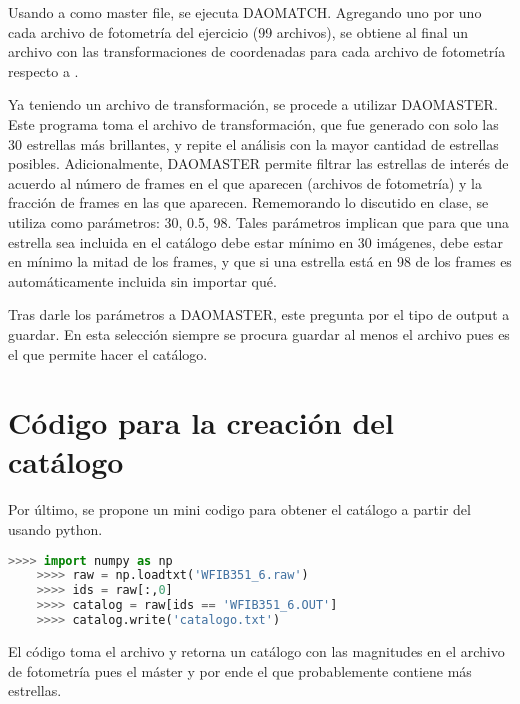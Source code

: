 \documentclass[12pt]{article}
\begin{document}
Usando a  como master file, se ejecuta DAOMATCH. Agregando uno por uno cada archivo de fotometría del ejercicio (99 archivos), se obtiene al final un archivo  con las transformaciones de coordenadas para cada archivo de fotometría respecto a .

Ya teniendo un archivo de transformación, se procede a utilizar DAOMASTER. Este programa toma el archivo de transformación, que fue generado con solo las 30 estrellas más brillantes, y repite el análisis con la mayor cantidad de estrellas posibles. Adicionalmente, DAOMASTER permite filtrar las estrellas de interés de acuerdo al número de frames en el que aparecen (archivos de fotometría) y la fracción de frames en las que aparecen. Rememorando lo discutido en clase, se utiliza como parámetros: 30, 0.5, 98.
Tales parámetros implican que para que una estrella sea incluida en el catálogo debe estar mínimo en 30 imágenes, debe estar en mínimo la mitad de los frames,  y que si una estrella está en 98 de los frames es automáticamente incluida sin importar qué.

Tras darle los parámetros a DAOMASTER, este pregunta por el tipo de output a guardar. En esta selección siempre se procura guardar al menos el archivo  pues es el que permite hacer el catálogo.

\section{Código para la creación del catálogo}
Por último, se propone un mini codigo para obtener el catálogo a partir del  usando python.


\begin{lstlisting}[language=python]
	>>>> import numpy as np
	>>>> raw = np.loadtxt('WFIB351_6.raw')
	>>>> ids = raw[:,0]
	>>>> catalog = raw[ids == 'WFIB351_6.OUT']
	>>>> catalog.write('catalogo.txt')
\end{lstlisting}

El código toma el archivo  y retorna un catálogo con las magnitudes en el archivo de fotometría  pues el máster y por ende el que probablemente contiene más estrellas.




%

\end{document}
